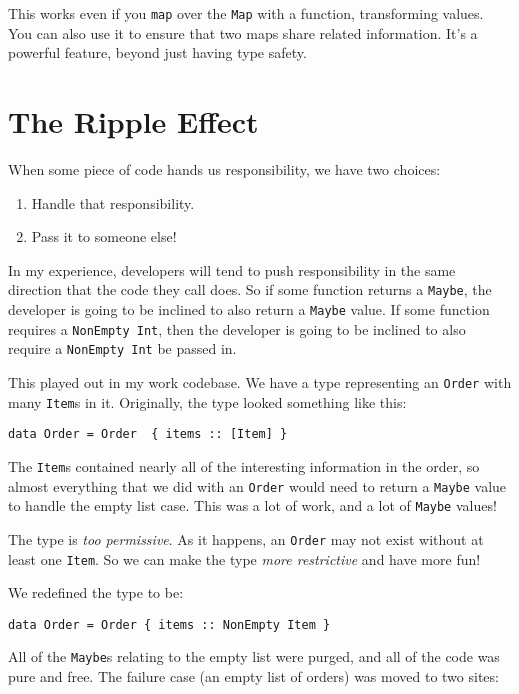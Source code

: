 This works even if you \texttt{map} over the \texttt{Map} with a function, transforming values. You can also use it to ensure that two maps share related information. It's a powerful feature, beyond just having type safety.






\section{The Ripple Effect}

When some piece of code hands us responsibility, we have two choices:

\begin{enumerate}
\item Handle that responsibility.
\item Pass it to someone else!
\end{enumerate}
In my experience, developers will tend to push responsibility in the same direction that the code they call does. So if some function returns a \texttt{Maybe}, the developer is going to be inclined to also return a \texttt{Maybe} value. If some function requires a \texttt{NonEmpty Int}, then the developer is going to be inclined to also require a \texttt{NonEmpty Int} be passed in.

This played out in my work codebase. We have a type representing an \texttt{Order} with many \texttt{Item}s in it. Originally, the type looked something like this:

\begin{verbatim}
data Order = Order  { items :: [Item] }
\end{verbatim}
The \texttt{Item}s contained nearly all of the interesting information in the order, so almost everything that we did with an \texttt{Order} would need to return a \texttt{Maybe} value to handle the empty list case. This was a lot of work, and a lot of \texttt{Maybe} values!

The type is \textit{too permissive}. As it happens, an \texttt{Order} may not exist without at least one \texttt{Item}. So we can make the type \textit{more restrictive} and have more fun!

We redefined the type to be:

\begin{verbatim}
data Order = Order { items :: NonEmpty Item }
\end{verbatim}
All of the \texttt{Maybe}s relating to the empty list were purged, and all of the code was pure and free. The failure case (an empty list of orders) was moved to two sites:

